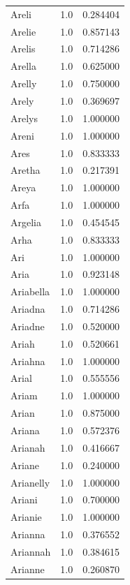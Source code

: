\documentclass[
  letterpaper,
  DIV=11,
  numbers=noendperiod]{scrreprt}
\begin{document}
\begin{tabular}{lrr}
Areli           &   1.0 &   0.284404 \\
Arelie          &   1.0 &   0.857143 \\
Arelis          &   1.0 &   0.714286 \\
Arella          &   1.0 &   0.625000 \\
Arelly          &   1.0 &   0.750000 \\
Arely           &   1.0 &   0.369697 \\
Arelys          &   1.0 &   1.000000 \\
Areni           &   1.0 &   1.000000 \\
Ares            &   1.0 &   0.833333 \\
Aretha          &   1.0 &   0.217391 \\
Areya           &   1.0 &   1.000000 \\
Arfa            &   1.0 &   1.000000 \\
Argelia         &   1.0 &   0.454545 \\
Arha            &   1.0 &   0.833333 \\
Ari             &   1.0 &   1.000000 \\
Aria            &   1.0 &   0.923148 \\
Ariabella       &   1.0 &   1.000000 \\
Ariadna         &   1.0 &   0.714286 \\
Ariadne         &   1.0 &   0.520000 \\
Ariah           &   1.0 &   0.520661 \\
Ariahna         &   1.0 &   1.000000 \\
Arial           &   1.0 &   0.555556 \\
Ariam           &   1.0 &   1.000000 \\
Arian           &   1.0 &   0.875000 \\
Ariana          &   1.0 &   0.572376 \\
Arianah         &   1.0 &   0.416667 \\
Ariane          &   1.0 &   0.240000 \\
Arianelly       &   1.0 &   1.000000 \\
Ariani          &   1.0 &   0.700000 \\
Arianie         &   1.0 &   1.000000 \\
Arianna         &   1.0 &   0.376552 \\
Ariannah        &   1.0 &   0.384615 \\
Arianne         &   1.0 &   0.260870 \\

\end{tabular}
\end{document}

